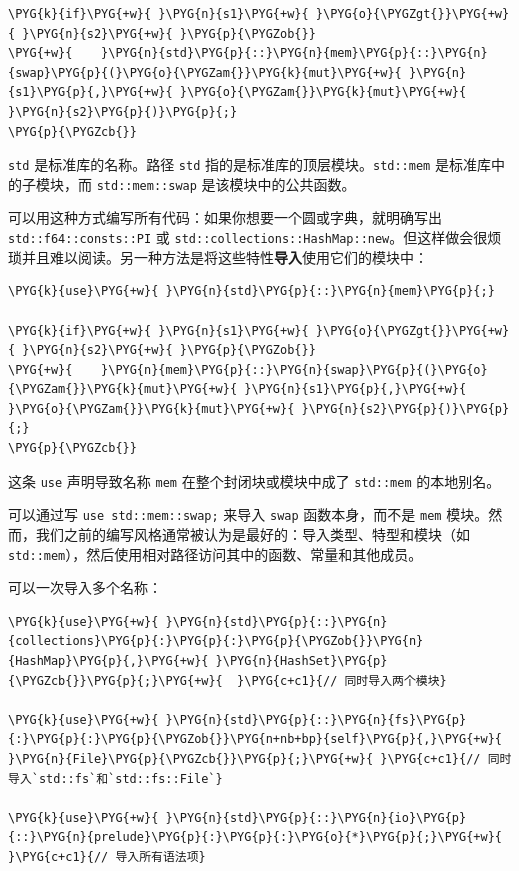 \begin{Verbatim}[commandchars=\\\{\},breaklines=true,breakanywhere=true,fontsize=\codefont,xleftmargin=17bp]
\PYG{k}{if}\PYG{+w}{ }\PYG{n}{s1}\PYG{+w}{ }\PYG{o}{\PYGZgt{}}\PYG{+w}{ }\PYG{n}{s2}\PYG{+w}{ }\PYG{p}{\PYGZob{}}
\PYG{+w}{    }\PYG{n}{std}\PYG{p}{::}\PYG{n}{mem}\PYG{p}{::}\PYG{n}{swap}\PYG{p}{(}\PYG{o}{\PYGZam{}}\PYG{k}{mut}\PYG{+w}{ }\PYG{n}{s1}\PYG{p}{,}\PYG{+w}{ }\PYG{o}{\PYGZam{}}\PYG{k}{mut}\PYG{+w}{ }\PYG{n}{s2}\PYG{p}{)}\PYG{p}{;}
\PYG{p}{\PYGZcb{}}
\end{Verbatim}

\texttt{std} 是标准库的名称。路径 \texttt{std} 指的是标准库的顶层模块。\texttt{std::mem} 是标准库中的子模块，而 \texttt{std::mem::swap} 是该模块中的公共函数。

可以用这种方式编写所有代码：如果你想要一个圆或字典，就明确写出 \texttt{std::f64::consts::PI} 或 \texttt{std::collections::HashMap::new}。但这样做会很烦琐并且难以阅读。另一种方法是将这些特性\textbf{导入}使用它们的模块中：

\begin{Verbatim}[commandchars=\\\{\},breaklines=true,breakanywhere=true,fontsize=\codefont,xleftmargin=17bp]
\PYG{k}{use}\PYG{+w}{ }\PYG{n}{std}\PYG{p}{::}\PYG{n}{mem}\PYG{p}{;}

\PYG{k}{if}\PYG{+w}{ }\PYG{n}{s1}\PYG{+w}{ }\PYG{o}{\PYGZgt{}}\PYG{+w}{ }\PYG{n}{s2}\PYG{+w}{ }\PYG{p}{\PYGZob{}}
\PYG{+w}{    }\PYG{n}{mem}\PYG{p}{::}\PYG{n}{swap}\PYG{p}{(}\PYG{o}{\PYGZam{}}\PYG{k}{mut}\PYG{+w}{ }\PYG{n}{s1}\PYG{p}{,}\PYG{+w}{ }\PYG{o}{\PYGZam{}}\PYG{k}{mut}\PYG{+w}{ }\PYG{n}{s2}\PYG{p}{)}\PYG{p}{;}
\PYG{p}{\PYGZcb{}}
\end{Verbatim}

这条 \texttt{use} 声明导致名称 \texttt{mem} 在整个封闭块或模块中成了 \texttt{std::mem} 的本地别名。

可以通过写 \texttt{use std::mem::swap;} 来导入 \texttt{swap} 函数本身，而不是 \texttt{mem} 模块。然而，我们之前的编写风格通常被认为是最好的：导入类型、特型和模块（如 \texttt{std::mem}），然后使用相对路径访问其中的函数、常量和其他成员。

可以一次导入多个名称：

\begin{Verbatim}[commandchars=\\\{\},breaklines=true,breakanywhere=true,fontsize=\codefont,xleftmargin=17bp]
\PYG{k}{use}\PYG{+w}{ }\PYG{n}{std}\PYG{p}{::}\PYG{n}{collections}\PYG{p}{:}\PYG{p}{:}\PYG{p}{\PYGZob{}}\PYG{n}{HashMap}\PYG{p}{,}\PYG{+w}{ }\PYG{n}{HashSet}\PYG{p}{\PYGZcb{}}\PYG{p}{;}\PYG{+w}{  }\PYG{c+c1}{// 同时导入两个模块}

\PYG{k}{use}\PYG{+w}{ }\PYG{n}{std}\PYG{p}{::}\PYG{n}{fs}\PYG{p}{:}\PYG{p}{:}\PYG{p}{\PYGZob{}}\PYG{n+nb+bp}{self}\PYG{p}{,}\PYG{+w}{ }\PYG{n}{File}\PYG{p}{\PYGZcb{}}\PYG{p}{;}\PYG{+w}{ }\PYG{c+c1}{// 同时导入`std::fs`和`std::fs::File`}

\PYG{k}{use}\PYG{+w}{ }\PYG{n}{std}\PYG{p}{::}\PYG{n}{io}\PYG{p}{::}\PYG{n}{prelude}\PYG{p}{:}\PYG{p}{:}\PYG{o}{*}\PYG{p}{;}\PYG{+w}{  }\PYG{c+c1}{// 导入所有语法项}
\end{Verbatim}

